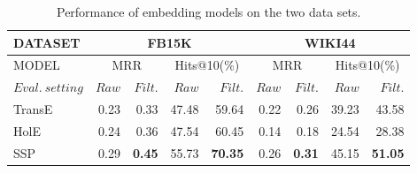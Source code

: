 \begin{table}[t]
\scriptsize
\centering
\begin{tabular}{|l|r r|r r|r r|r r|} 
 \hline
 DATASET & \multicolumn{4}{|c|}{FB15K} & \multicolumn{4}{|c|}{WIKI44}\\
 \hline
 MODEL & \multicolumn{2}{|c|}{MRR}& \multicolumn{2}{|c|}{Hits@10(\%)} & \multicolumn{2}{|c|}{MRR}& \multicolumn{2}{|c|}{Hits@10(\%)} \\
 $Eval.\ setting$ & $Raw$ & $Filt.$ & $Raw$ & $Filt.$ & $Raw$ & $Filt.$ & $Raw$ & $Filt.$\\
 \hline
 TransE& 0.23 & 0.33 & 47.48 & 59.64 & 0.22 & 0.26 & 39.23 & 43.58\\
 HolE & 0.24 & 0.36 & 47.54 & 60.45& 0.14 & 0.18 & 24.54 & 28.38  \\
 SSP & 0.29 & \textbf{0.45}& 55.73 & \textbf{70.35}& 0.26 & \textbf{0.31} & 45.15 & \textbf{51.05} \\
 \hline
\end{tabular}
\caption{Performance of embedding models on the two data sets.}
\label{table:embedding_performance}
\vspace*{-3mm}
\end{table}